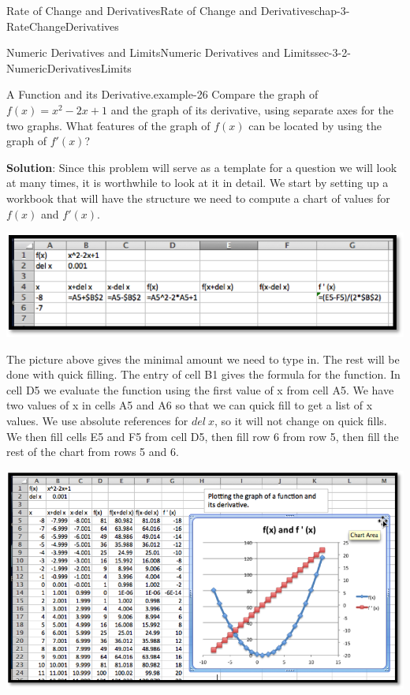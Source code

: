 \documentclass[oneside,10pt,]{book}
\newcommand{\terminology}[1]{\textbf{#1}}
\numberwithin{equation}{section}
\begin{document}
\begin{chapterptx}{Rate of Change and Derivatives}{}{Rate of Change and Derivatives}{}{}{chap-3-RateChangeDerivatives}
\begin{sectionptx}{Numeric Derivatives and Limits}{}{Numeric Derivatives and Limits}{}{}{sec-3-2-NumericDerivativesLimits}
\begin{example}{A Function and its Derivative.}{example-26}
\hypertarget{p-1036}{}%
Compare the graph of \(f(x)=x^2-2 x+1\) and the graph of its derivative, using separate axes for the two graphs.  What features of the graph of \(f(x)\) can be located by using the graph of \(f'(x)\)?%
\par
\hypertarget{p-1037}{}%
\terminology{Solution}: Since this problem will serve as a template for a question we will look at many times, it is worthwhile to look at it in detail.  We start by setting up a workbook that will have the structure we need to compute a chart of values for \(f(x)\) and \(f'(x)\).%
\begin{sidebyside}{1}{0.15}{0.15}{0}%
\begin{sbspanel}{0.7}%
\includegraphics[width=1\linewidth]{images/sec3-2-7.png}
\end{sbspanel}%
\end{sidebyside}%
\par
\hypertarget{p-1038}{}%
The picture above gives the minimal amount we need to type in.  The rest will be done with quick filling.  The entry of cell B1 gives the formula for the function.  In cell D5 we evaluate the function using the first value of x from cell A5.  We have two values of x in cells A5 and A6 so that we can quick fill to get a list of x values.  We use absolute references for \(del\ x\), so it will not change on quick fills.  We then fill cells E5 and F5 from cell D5, then fill row 6 from row 5, then fill the rest of the chart from rows 5 and 6.%
\begin{sidebyside}{1}{0.05}{0.05}{0}%
\begin{sbspanel}{0.9}%
\includegraphics[width=1\linewidth]{images/sec3-2-8.png}

\end{sbspanel}
\end{sidebyside}
\end{example}
\end{sectionptx}
\end{chapterptx}
\end{document}
